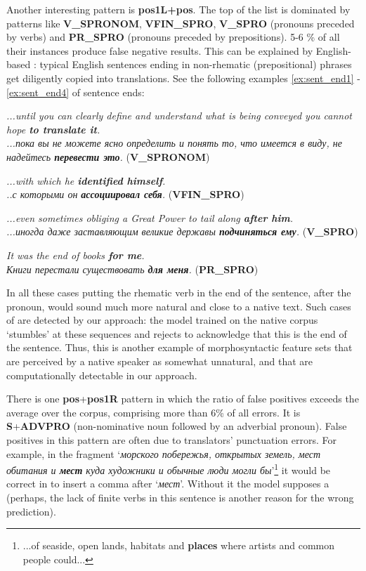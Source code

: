 \documentclass[output=paper]{langsci/langscibook.cls}
\begin{document}
Another interesting pattern is \textbf{pos1L+pos}. The top of the list is dominated by patterns like \textbf{V\_SPRONOM}, \textbf{VFIN\_SPRO}, \textbf{V\_SPRO} (pronouns preceded by verbs) and \textbf{PR\_SPRO} (pronouns preceded by prepositions). 5-6 \% of all their instances produce false negative results. This can be explained by English-based : typical English sentences ending in non-rhematic (prepositional) phrases get diligently copied into  translations. See the following examples \ref{ex:sent_end1} - \ref{ex:sent_end4} of sentence ends:

\ea
\label{ex:sent_end1}
\textit{...until you can clearly define and understand what is being conveyed you cannot hope \textbf{to translate it}.} \\ 
\textit{...пока вы не можете ясно определить и понять то, что имеется в виду, не надейтесь \textbf{перевести это}.} (\textbf{V\_SPRONOM})
\z

\ea
\label{ex:sent_end2}
\textit{...with which he \textbf{identified himself}.}\\ \textit{..с которыми он \textbf{ассоциировал себя}.} (\textbf{VFIN\_SPRO})
\z

\ea
\label{ex:sent_end3}
\textit{...even sometimes obliging a Great Power to tail along \textbf{after him}.}\\ \textit{...иногда даже заставляющим великие державы \textbf{подчиняться ему}.} (\textbf{V\_SPRO})
\z

\ea
\label{ex:sent_end4}
\textit{It was the end of books \textbf{for me}.} \\ \textit{Книги перестали существовать \textbf{для меня}.} (\textbf{PR\_SPRO})
\z

In all these cases putting the rhematic verb in the end of the sentence, after the pronoun, would sound much more natural and close to a native text. Such cases of  are detected by our approach: the model trained on the native corpus `stumbles' at these sequences and rejects to acknowledge that this is the end of the sentence. Thus, this is another example of morphosyntactic feature sets that are perceived by a native speaker as somewhat unnatural, and that are computationally detectable in our approach.

There is one \textbf{pos}+\textbf{pos1R} pattern in which the ratio of false positives exceeds the average over the corpus, comprising more than 6\% of all errors. It is \textbf{S}+\textbf{ADVPRO} (non-nominative noun followed by an adverbial pronoun). False positives in this pattern are often due to translators' punctuation errors. For example, in the fragment `\textit{морского побережья, открытых земель, мест обитания и \textbf{мест} куда художники и обычные люди могли бы}'\footnote{...of seaside, open lands, habitats and \textbf{places} where artists and common people could...} it would be correct in  to insert a comma after `\textit{мест}'. Without it the model supposes a  (perhaps, the lack of finite verbs in this sentence is another reason for the wrong prediction). 
\end{document}
